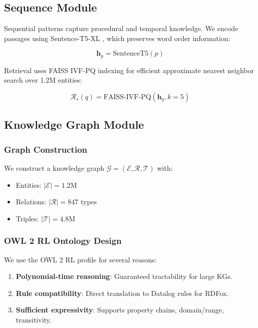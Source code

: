 \documentclass[10pt,twocolumn]{article}
\begin{document}
\subsection{Sequence Module}

Sequential patterns capture procedural and temporal knowledge. We encode passages using Sentence-T5-XL \cite{ni2022sentence_t5}, which preserves word order information:

\begin{equation}
\mathbf{h}_p = \text{SentenceT5}(p)
\end{equation}

Retrieval uses FAISS IVF-PQ indexing \cite{johnson2019faiss} for efficient approximate nearest neighbor search over 1.2M entities:

\begin{equation}
\mathcal{R}_s(q) = \text{FAISS-IVF-PQ}(\mathbf{h}_q, k=5)
\end{equation}

\subsection{Knowledge Graph Module}
\label{sec:ontology}

\subsubsection{Graph Construction}

We construct a knowledge graph $\mathcal{G} = (\mathcal{E}, \mathcal{R}, \mathcal{T})$ with:
\begin{itemize}
    \item Entities: $|\mathcal{E}| = 1.2$M
    \item Relations: $|\mathcal{R}| = 847$ types
    \item Triples: $|\mathcal{T}| = 4.8$M
\end{itemize}

\subsubsection{OWL 2 RL Ontology Design}
\label{sec:owl2rl}

We use the OWL 2 RL profile \cite{motik2012owl2} for several reasons:
\begin{enumerate}
    \item \textbf{Polynomial-time reasoning}: Guaranteed tractability for large KGs.
    \item \textbf{Rule compatibility}: Direct translation to Datalog rules for RDFox.
    \item \textbf{Sufficient expressivity}: Supports property chains, domain/range, transitivity.
\end{enumerate}
\end{document}
